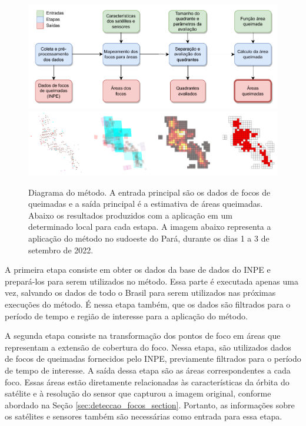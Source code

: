 \documentclass[cic,tc]{iiufrgs}
\begin{document}
\begin{figure}[!htb]
    \caption{Diagrama do método. A entrada principal são os dados de focos de queimadas e a saída principal é a estimativa de áreas queimadas. Abaixo os resultados produzidos com a aplicação em um determinado local para cada estapa. A imagem abaixo representa a aplicação do método no sudoeste do Pará, durante os dias 1 a 3 de setembro de 2022.}
    \begin{center}
        \includegraphics[width=35em]{metodologica_workflow}
        \includegraphics[width=35em]{exemplo_metodo_completo}
    \end{center}
    \label{fig:metodologica_workflow}
\end{figure}

A primeira etapa consiste em obter os dados da base de dados do INPE e prepará-los para serem utilizados no método. Essa parte é executada apenas uma vez, salvando os dados de todo o Brasil para serem utilizados nas próximas execuções do método. É nessa etapa também, que os dados são filtrados para o período de tempo e região de interesse para a aplicação do método. 

A segunda etapa consiste na transformação dos pontos de foco em áreas que representam a extensão de cobertura do foco. Nessa etapa, são utilizados dados de focos de queimadas fornecidos pelo INPE, previamente filtrados para o período de tempo de interesse. A saída dessa etapa são as áreas correspondentes a cada foco. Essas áreas estão diretamente relacionadas às características da órbita do satélite e à resolução do sensor que capturou a imagem original, conforme abordado na Seção \ref{sec:deteccao_focos_section}. Portanto, as informações sobre os satélites e sensores também são necessárias como entrada para essa etapa.
\end{document}
